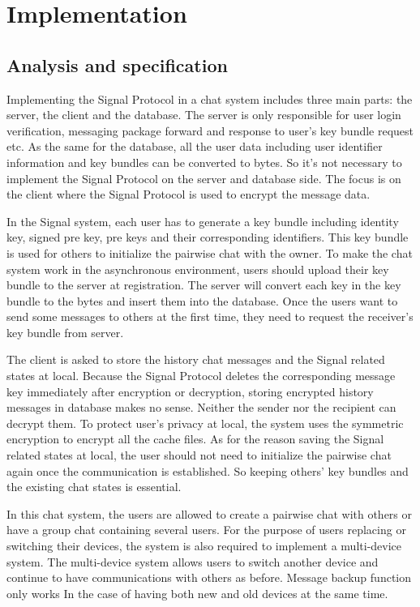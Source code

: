 \section{Implementation}

\subsection{Analysis and specification}
Implementing the Signal Protocol in a chat system includes three main parts: the server, the client and the database. The server is only responsible for user login verification, messaging package forward and response to user's key bundle request etc. As the same for the database, all the user data including user identifier information and key bundles can be converted to bytes. So it's not necessary to implement the Signal Protocol on the server and database side. The focus is on the client where the Signal Protocol is used to encrypt the message data.

In the Signal system, each user has to generate a key bundle including identity key, signed pre key, pre keys and their corresponding identifiers. This key bundle is used for others to initialize the pairwise chat with the owner. To make the chat system work in the asynchronous environment, users should upload their key bundle to the server at registration. The server will convert each key in the key bundle to the bytes and insert them into the database. Once the users want to send some messages to others at the first time, they need to request the receiver's key bundle from server.

The client is asked to store the history chat messages and the Signal related states at local. Because the Signal Protocol deletes the corresponding message key immediately after encryption or decryption, storing encrypted history messages in database makes no sense. Neither the sender nor the recipient can decrypt them. To protect user's privacy at local, the system uses the symmetric encryption to encrypt all the cache files. As for the reason saving the Signal related states at local, the user should not need to initialize the pairwise chat again once the communication is established. So keeping others' key bundles and the existing chat states is essential.

In this chat system, the users are allowed to create a pairwise chat with others or have a group chat containing several users. For the purpose of users replacing or switching their devices, the system is also required to implement a multi-device system. The multi-device system allows users to switch another device and continue to have communications with others as before. Message backup function only works In the case of having both new and old devices at the same time.

